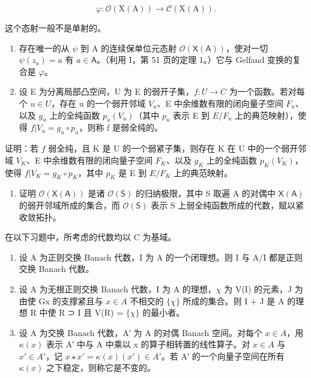 \[
\varphi \colon \mathcal {O} (\mathrm{X} (\mathrm{A})) \longrightarrow \mathcal {C} (\mathrm{X} (\mathrm{A})).
\]

这个态射一般不是单射的。

\begin{enumerate}
\def\labelenumi{\alph{enumi})}
\setcounter{enumi}{2}
\item
  存在唯一的从 \(\psi\) 到 A 的连续保单位元态射 \(\mathcal{O}(\mathsf{X}(\mathsf{A}))\)，使对一切 \(\psi(z_a) = a\) 有 \(a \in \mathsf{A}\)。（利用 I，第 51 页的定理 1。）它与 Gelfand 变换的复合是 \(\varphi\)。
\item
  设 E 为分离局部凸空间，U 为 E 的弱开子集，\(f: U \to C\) 为一个函数。若对每个 \(u \in U\)，存在 u 的一个弱开邻域 \(V_u\)、E 中余维数有限的闭向量子空间 \(F_u\)、以及 \(g_u\) 上的全纯函数 \(p_u(V_u)\)（其中 \(p_u\) 表示 E 到 \(E/F_u\) 上的典范映射），使得 \(f|V_u = g_u \circ p_u\)，则称 f 是弱全纯的。
\end{enumerate}

  证明：若 \(f\) 弱全纯，且 K 是 U 的一个弱紧子集，则存在 K 在 U 中的一个弱开邻域 \(V_K\)、E 中余维数有限的闭向量子空间 \(F_K\)、以及 \(g_K\) 上的全纯函数 \(p_K(V_K)\)，使得 \(f|V_K = g_K \circ p_K\)，其中 \(p_K\) 是 E 到 \(E/F_K\) 上的典范映射。

\begin{enumerate}
\def\labelenumi{\alph{enumi})}
\setcounter{enumi}{4}
\tightlist
\item
  证明 \(\mathcal{O}(\mathsf{X}(\mathsf{A}))\) 是诸 \(\mathcal{O}(\mathsf{S})\) 的归纳极限，其中 S 取遍 A 的对偶中 \(\mathsf{X}(\mathsf{A})\) 的弱开邻域所成的集合，而 \(\mathcal{O}(\mathsf{S})\) 表示 S 上弱全纯函数所成的代数，赋以紧收敛拓扑。
\end{enumerate}


在以下习题中，所考虑的代数均以 C 为基域。

\begin{enumerate}
\def\labelenumi{\arabic{enumi})}
\item
  设 A 为正则交换 Banach 代数，I 为 A 的一个闭理想。则 I 与 A/I 都是正则交换 Banach 代数。
\item
  设 A 为无根正则交换 Banach 代数，I 为 A 的理想，\(\chi\) 为 V(I) 的元素，J 为由使 Gx 的支撑紧且与 \(x \in A\) 不相交的 \(\{\chi\}\) 所成的集合。则 I + J 是 A 的理想 R 中使 R ⊃ I 且 V(R) = \(\{\chi\}\) 的最小者。
\item
  设 A 为交换 Banach 代数，A′ 为 A 的对偶 Banach 空间。对每个 \(x \in A\)，用 \(\kappa(x)\) 表示 A′ 中与 A 中乘以 x 的算子相转置的线性算子。对 \(x \in A\) 与 \(x' \in A'\)，记 \(x \star x' = \kappa(x)(x') \in A'\)。若 A′ 的一个向量子空间在所有 \(\kappa(x)\) 之下稳定，则称它是不变的。
\end{enumerate}

